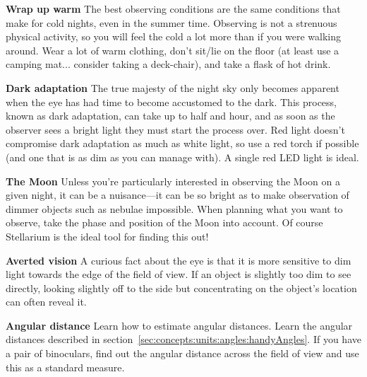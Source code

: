 \textbf{Wrap up warm} The best observing conditions are the same
conditions that make for cold nights, even in the summer time. Observing
is not a strenuous physical activity, so you will feel the cold a lot
more than if you were walking around. Wear a lot of warm clothing, don't
sit/lie on the floor (at least use a camping mat... consider taking a
deck-chair), and take a flask of hot drink.

\textbf{Dark adaptation} The true majesty of the night sky only becomes
apparent when the eye has had time to become accustomed to the dark.
This process, known as dark adaptation, can take up to half and hour,
and as soon as the observer sees a bright light they must start the
process over. Red light doesn't compromise dark adaptation as much as
white light, so use a red torch if possible (and one that is as dim as
you can manage with). A single red LED light is ideal.

\textbf{The Moon} Unless you're particularly interested in observing the
Moon on a given night, it can be a nuisance---it can be so bright as
to make observation of dimmer objects such as nebulae impossible. When
planning what you want to observe, take the phase and position of the
Moon into account. Of course Stellarium is the ideal tool for finding
this out!

\textbf{Averted vision} A curious fact about the eye is that it is more
sensitive to dim light towards the edge of the field of view. If an
object is slightly too dim to see directly, looking slightly off to the
side but concentrating on the object's location can often reveal it.

\textbf{Angular distance} Learn how to estimate angular distances. Learn
the angular distances described in section~\ref{sec:concepts:units:angles:handyAngles}. If you
have a pair of binoculars, find out the angular distance across the
field of view and use this as a standard measure.



